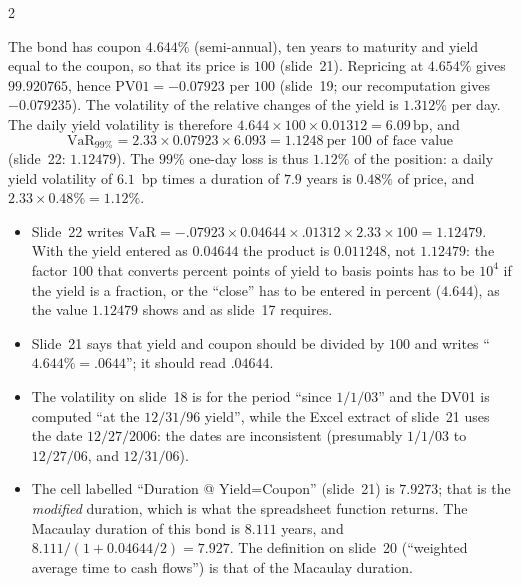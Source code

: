\begin{paracol}{2}
\begin{example}\label{ch19:ex-ust}
The bond has coupon $4.644\%$ (semi-annual), ten years to maturity and yield equal to the coupon, so that its price is $100$ (slide~21). Repricing at $4.654\%$ gives $99.920765$, hence $\mathrm{PV01}=-0.07923$ per $100$ (slide~19; our recomputation gives $-0.079235$). The volatility of the relative changes of the yield is $1.312\%$ per day. The daily yield volatility is therefore $4.644\times100\times0.01312=6.09\,\mathrm{bp}$, and
\[
  \mathrm{VaR}_{99\%}=2.33\times0.07923\times6.093=1.1248\ \text{per }100\text{ of face value}
\]
(slide~22: $1.12479$). The $99\%$ one-day loss is thus $1.12\%$ of the position: a daily yield volatility of $6.1$~bp times a duration of $7.9$ years is $0.48\%$ of price, and $2.33\times0.48\%=1.12\%$.
\end{example}

\begin{coursenote}\label{ch19:cn-slide22}
\begin{itemize}
  \item Slide~22 writes $\mathrm{VaR}=-.07923\times0.04644\times.01312\times2.33\times100=1.12479$. With the yield entered as $0.04644$ the product is $0.011248$, not $1.12479$: the factor $100$ that converts percent points of yield to basis points has to be $10^4$ if the yield is a fraction, or the ``close'' has to be entered in percent ($4.644$), as the value $1.12479$ shows and as slide~17 requires.
  \item Slide~21 says that yield and coupon should be divided by $100$ and writes ``$4.644\%=.0644$''; it should read $.04644$.
  \item The volatility on slide~18 is for the period ``since $1/1/03$'' and the DV01 is computed ``at the $12/31/96$ yield'', while the Excel extract of slide~21 uses the date $12/27/2006$: the dates are inconsistent (presumably $1/1/03$ to $12/27/06$, and $12/31/06$).
  \item The cell labelled ``Duration @ Yield=Coupon'' (slide~21) is $7.9273$; that is the \emph{modified} duration, which is what the spreadsheet function returns. The Macaulay duration of this bond is $8.111$ years, and $8.111/(1+0.04644/2)=7.927$. The definition on slide~20 (``weighted average time to cash flows'') is that of the Macaulay duration.
\end{itemize}
\end{coursenote}


\end{paracol}

